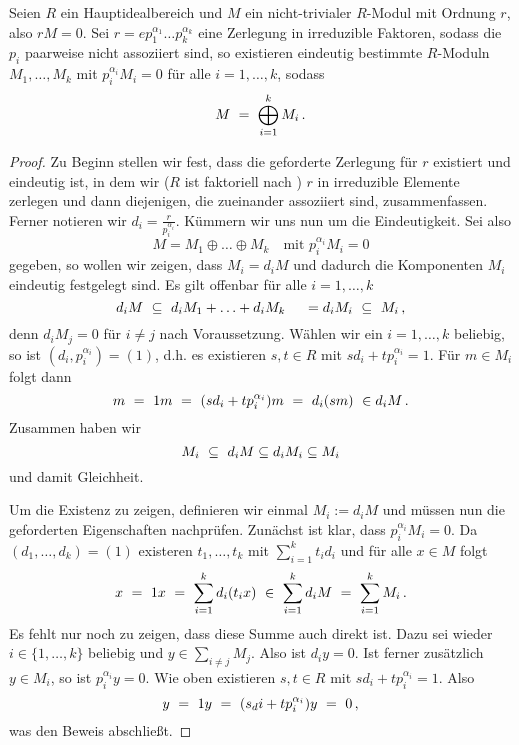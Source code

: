 \begin{satz}
  \label{satz:zerlegungssatz_moduln}
  Seien $R$ ein Hauptidealbereich und 
  $M$ ein nicht-trivialer $R$-Modul mit Ordnung $r$, also $rM = 0$.
  Sei $r = e p_1^{\alpha_1}\ldots p_k^{\alpha_k}$ eine Zerlegung in irreduzible
  Faktoren, sodass die $p_i$ paarweise nicht assoziiert sind, 
  so existieren eindeutig bestimmte $R$-Moduln 
  $M_1,\ldots,M_k$ mit $p_i^{\alpha_i}M_i = 0$ für alle $i=1,\ldots,k$, sodass
  \[ M \ =\  \bigoplus_{i=1}^k M_i\,.\]
\end{satz}
\begin{proof}
  Zu Beginn stellen wir fest, dass die geforderte Zerlegung für $r$ existiert
  und eindeutig ist, in dem wir ($R$ ist faktoriell nach 
  ) $r$ in irreduzible
  Elemente zerlegen und dann diejenigen, die zueinander assoziiert sind,
  zusammenfassen. Ferner notieren wir $d_i = \frac{r}{p_i^{\alpha_i}}$.
  Kümmern wir uns nun um die Eindeutigkeit. Sei also 
  \[ M = M_1 \oplus \ldots \oplus M_k \quad\text{mit } p_i^{\alpha_i} M_i = 0\]
  gegeben, so wollen wir zeigen, dass $M_i = d_i M$ und dadurch die Komponenten
  $M_i$ eindeutig festgelegt sind. Es gilt offenbar für alle $i=1,\ldots,k$
  \[ d_i M \ \subseteq\  d_i M_1 + \ldots + d_i M_k \ \ \ \ = d_i M_i 
    \ \subseteq\  M_i\,,\]
  denn $d_i M_j = 0$ für $i\neq j$ nach Voraussetzung. 
  Wählen wir ein $i = 1,\ldots,k$ beliebig, so ist 
  $(d_i, p_i^{\alpha_i}) = (1)$, d.h. es existieren $s,t \in R$ mit
  $sd_i + t p_i^{\alpha_i} = 1$. Für $m\in M_i$ folgt dann
  \[ m \speq= 1m \speq= (sd_i + tp_i^{\alpha_i})m \speq= d_i (sm)\ 
    \in d_i M\,. \]
  Zusammen haben wir 
  \[ M_i \ \subseteq\  d_iM \subseteq d_iM_i \subseteq M_i\]
  und damit Gleichheit.

  Um die Existenz zu zeigen, definieren wir einmal $M_i := d_iM$ und müssen nun
  die geforderten Eigenschaften nachprüfen. Zunächst ist klar, dass
  $p_i^{\alpha_i}M_i = 0$. Da $(d_1,\ldots,d_k) = (1)$ existeren 
  $t_1,\ldots,t_k$ mit $\sum_{i=1}^kt_id_i$ und für alle $x \in M$ folgt
  \[ x \ =\  1x \ =\  \sum_{i=1}^k d_i(t_ix) 
    \ \in\  \sum_{i=1}^k d_iM \ =\  \sum_{i=1}^k M_i\,.\]
  Es fehlt nur noch zu zeigen, dass diese Summe auch direkt ist. 
  Dazu sei wieder $i\in\{1,\ldots,k\}$ beliebig und 
  $y \in \sum_{i\neq j} M_j$. Also ist $d_iy = 0$. Ist ferner zusätzlich
  $y \in M_i$, so ist $p_i^{\alpha_i}y = 0$. Wie oben existieren $s,t \in R$
  mit $sd_i + tp_i^{\alpha_i} = 1$. Also
  \[ y \ =\  1y \ =\  (s_di + tp_i^{\alpha_i})y \ =\  0\,,\]
  was den Beweis abschließt.
\end{proof}




